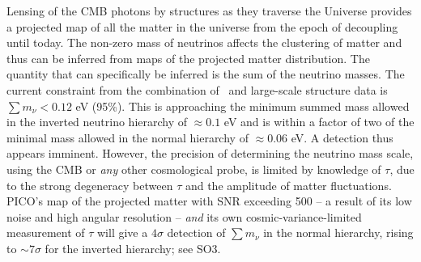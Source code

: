 \documentclass[PICOReport.tex]{subfiles}
\begin{document}
Lensing of the CMB photons by structures as they traverse the Universe provides a projected map of all the matter in the universe from the epoch of decoupling until today.  The non-zero mass of neutrinos affects the clustering of matter and thus can be inferred from maps of the projected matter distribution. The quantity that can specifically be inferred is the sum of the neutrino masses.  The current constraint from the combination of \planck\ and large-scale structure data is $\sum m_{\nu} < 0.12$ eV (95\%).  This is approaching the minimum summed mass allowed in the inverted neutrino hierarchy of $\approx 0.1$ eV and is within a factor of two of the minimal mass allowed in the normal hierarchy of $\approx 0.06$ eV.  A detection thus appears imminent.  However, the precision of determining the neutrino mass scale, using the CMB or {\it any} other cosmological probe, is limited by knowledge of $\tau$, due to the strong degeneracy between $\tau$ and the amplitude of matter fluctuations.  PICO's map of the projected matter with \ac{SNR} exceeding 500 -- a result of its low noise and high angular resolution -- {\it and} its own cosmic-variance-limited measurement of $\tau$ will give a $4\sigma$ detection of $\sum m_{\nu}$ in the normal hierarchy, rising to $\sim7\sigma$ for the inverted hierarchy; see SO3. 

\end{document}
